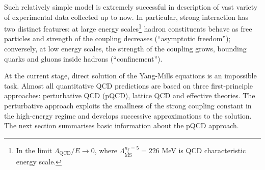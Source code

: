 Such relatively simple model is extremely successful in description of vast variety of experimental data collected up to now. In particular, strong interaction has two distinct features: at large energy scales\footnote{In the limit $\Lambda_\mathrm{QCD}/E\rightarrow 0$, where $\Lambda^{n_f=5}_{\overline{\mathrm{MS}}}=226$ MeV is QCD characteristic energy scale.} hadron constituents behave as free particles and strength of the coupling decreases (``asymptotic freedom''); conversely, at low energy scales, the strength of the coupling grows, bounding quarks and gluons inside hadrons (``confinement'').  
 
At the current stage, direct solution of the Yang-Mills equations is an impossible task. Almost all quantitative QCD predictions are based on three first-principle approaches: perturbative QCD (pQCD), lattice QCD and effective theories. The perturbative approach exploits the smallness of the strong coupling constant in the high-energy regime and develops successive approximations to the solution. The next section summarises basic information about the pQCD approach.

